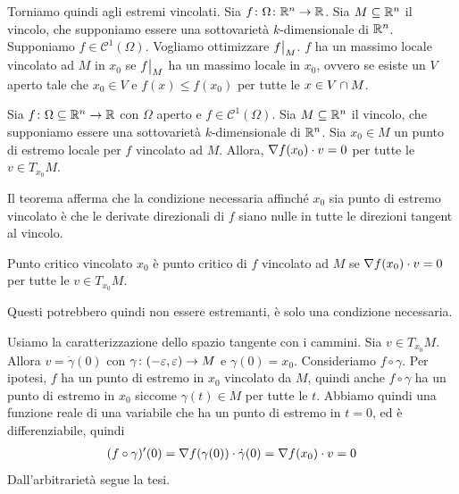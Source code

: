 \documentclass[a4paper]{article}
\begin{document}
Torniamo quindi agli estremi vincolati. Sia
\(f\colon \Omega \colon \mathbb{R}^n \to \mathbb{R}\).
Sia \(M \subseteq \mathbb{R}^n\) il vincolo, che supponiamo essere una sottovarietà
\(k\)-dimensionale di \(\mathbb{R}^n\).
Supponiamo \(f \in \mathcal{C}^1(\Omega)\).
Vogliamo ottimizzare \(\restr{f}{M}\).
\(f\) ha un massimo locale vincolato ad \(M\)
in \(x_0\) se \(\restr{f}{M}\) ha un massimo locale in \(x_0\), ovvero
se esiste un \(V\) aperto tale che \(x_0 \in V\) e \(f(x) \leq f(x_0)\)
per tutte le \(x\in V \cap M\).

\begin{snippettheorem}{}
    Sia \(f \colon \Omega \subseteq \mathbb{R}^n \to \mathbb{R}\)
    con \(\Omega\) aperto e \(f \in \mathcal{C}^1(\Omega)\).
    Sia \(M \subseteq \mathbb{R}^n\) il vincolo, che supponiamo essere una sottovarietà
    \(k\)-dimensionale di \(\mathbb{R}^n\).
    Sia \(x_0 \in M\) un punto di estremo locale per \(f\) vincolato ad \(M\).
    Allora, \(\nabla f(x_0) \cdot v = 0\)
    per tutte le \(v \in T_{x_0}M\).
\end{snippettheorem}

Il teorema afferma che la condizione necessaria affinché \(x_0\)
sia punto di estremo vincolato
è che le derivate direzionali di \(f\) siano nulle in tutte le direzioni tangent al vincolo.

\begin{snippetdefinition}{Punto critico vincolato}
    \(x_0\) è punto critico di \(f\) vincolato ad \(M\) se \(\nabla f(x_0) \cdot v = 0\)
    per tutte le \(v \in T_{x_0}M\).
\end{snippetdefinition}

Questi potrebbero quindi non essere estremanti, è solo una condizione necessaria.

\begin{snippetproof}{}
    Usiamo la caratterizzazione dello spazio tangente con i cammini.
    Sia \(v \in T_{x_0} M\). Allora \(v = \dot\gamma(0)\)
    con \(\gamma \colon (-\varepsilon, \varepsilon) \to M\)
    e \(\gamma(0) = x_0\).
    Consideriamo \(f \circ \gamma\).
    Per ipotesi, \(f\) ha un punto di estremo in \(x_0\) vincolato da \(M\),
    quindi anche \(f \circ \gamma\) ha un punto di estremo in \(x_0\) siccome \(\gamma(t) \in M\)
    per tutte le \(t\).
    Abbiamo quindi una funzione reale di una variabile che ha un punto di estremo in \(t=0\),
    ed è differenziabile, quindi \begin{align*}
        (f\circ\gamma)'(0) = \nabla f(\gamma(0)) \cdot \dot\gamma(0)
         = \nabla f(x_0) \cdot v = 0
    \end{align*}
    Dall'arbitrarietà segue la tesi.
\end{snippetproof}
\end{document}
